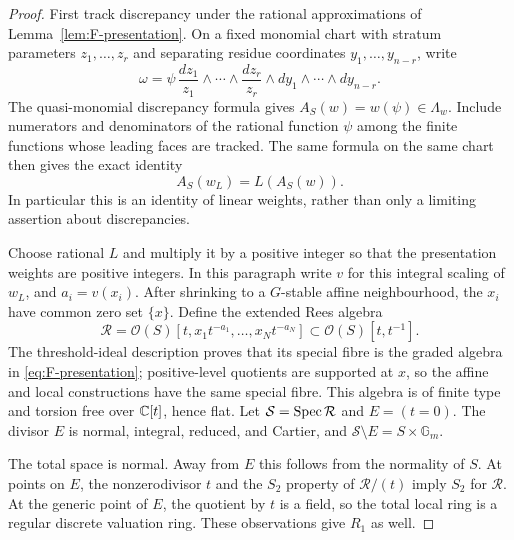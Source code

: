 \begin{proof}
First track discrepancy under the rational approximations of
Lemma~\ref{lem:F-presentation}.  On a fixed monomial chart with
stratum parameters $z_1,\ldots,z_r$ and separating residue
coordinates $y_1,\ldots,y_{n-r}$, write
\[
 \omega=\psi\,
 \frac{dz_1}{z_1}\wedge\cdots\wedge\frac{dz_r}{z_r}
 \wedge dy_1\wedge\cdots\wedge dy_{n-r}.
\]
The quasi-monomial discrepancy formula gives
$A_S(w)=w(\psi)\in\Lambda_w$.  Include numerators and denominators
of the rational function $\psi$ among the finite functions whose
leading faces are tracked.  The same formula on the same chart
then gives the exact identity
\begin{equation}\label{eq:F-discrepancy-approximation}
 A_S(w_L)=L(A_S(w)).
\end{equation}
In particular this is an identity of linear weights, rather than
only a limiting assertion about discrepancies.

Choose rational $L$ and multiply it by a positive integer so that
the presentation weights are positive integers.  In this paragraph
write $v$ for this integral scaling of $w_L$, and $a_i=v(x_i)$.
After shrinking to a $G$-stable affine neighbourhood, the $x_i$
have common zero set $\{x\}$.  Define the extended Rees algebra
\begin{equation}\label{eq:F-rees}
 \mathcal R=\mathcal O(S)[t,x_1t^{-a_1},\ldots,x_Nt^{-a_N}]
       \subset\mathcal O(S)[t,t^{-1}].
\end{equation}
The threshold-ideal description proves that its special fibre is
the graded algebra in \eqref{eq:F-presentation}; positive-level
quotients are supported at $x$, so the affine and local
constructions have the same special fibre.  This algebra is of
finite type and torsion free over $\mathbb C[t]$, hence flat.  Let
$\mathcal S=\operatorname{Spec}\mathcal R$ and $E=(t=0)$.  The divisor $E$ is
normal, integral, reduced, and Cartier, and
$\mathcal S\setminus E=S\times\mathbb G_m$.

The total space is normal.  Away from $E$ this follows from the
normality of $S$.  At points on $E$, the nonzerodivisor $t$ and
the $S_2$ property of $\mathcal R/(t)$ imply $S_2$ for
$\mathcal R$.  At the generic point of $E$, the quotient by $t$
is a field, so the total local ring is a regular discrete
valuation ring.  These observations give $R_1$ as well.


\end{proof}
